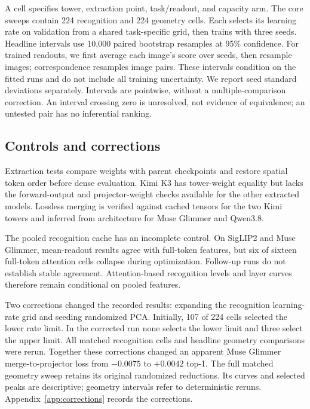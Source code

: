 A cell specifies tower, extraction point, task/readout, and capacity arm. The core sweeps
contain 224 recognition and 224 geometry cells. Each selects its learning rate on
validation from a shared task-specific grid, then trains with three seeds. Headline
intervals use 10,000 paired bootstrap resamples at 95\% confidence. For trained readouts,
we first average each image's score over seeds, then resample images; correspondence
resamples image pairs. These intervals condition on the fitted runs and do not include
all training uncertainty. We report seed standard deviations separately. Intervals are
pointwise, without a multiple-comparison correction. An interval crossing zero is
unresolved, not evidence of equivalence; an untested pair has no inferential ranking.

\subsection{Controls and corrections}
\label{sec:controls}
Extraction tests compare weights with parent checkpoints and restore spatial token order
before dense evaluation. Kimi K3 has tower-weight equality but lacks the forward-output
and projector-weight checks available for the other extracted models. Lossless merging
is verified against cached tensors for the two Kimi towers and inferred from architecture
for Muse Glimmer and Qwen3.8.

The pooled recognition cache has an incomplete control. On SigLIP2 and Muse Glimmer,
mean-readout results agree with full-token features, but six of sixteen full-token
attention cells collapse during optimization. Follow-up runs do not establish stable
agreement. Attention-based recognition levels and layer curves therefore remain
conditional on pooled features.

Two corrections changed the recorded results: expanding the recognition learning-rate
grid and seeding randomized PCA. Initially, 107 of 224 cells selected the lower rate
limit. In the corrected run none selects the lower limit and three select the upper
limit. All matched recognition cells and headline geometry comparisons were rerun. Together these corrections changed an apparent Muse
Glimmer merge-to-projector loss from $-0.0075$ to $+0.0042$ top-1. The full matched geometry sweep retains its original
randomized reductions. Its curves and selected peaks are descriptive; geometry intervals
refer to deterministic reruns. Appendix~\ref{app:corrections} records the corrections.
